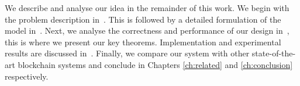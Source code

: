 We describe and analyse our idea in the remainder of this work.
We begin with the problem description in~.
This is followed by a detailed formulation of the model in~. 
Next, we analyse the correctness and performance of our design in~, this is where we present our key theorems.
Implementation and experimental results are discussed in~.
Finally, we compare our system with other state-of-the-art blockchain systems and conclude in Chapters \ref{ch:related} and \ref{ch:conclusion} respectively.

